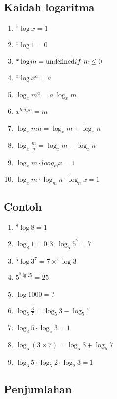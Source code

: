 \documentclass[
  letterpaper,
  DIV=11,
  numbers=noendperiod]{scrartcl}
\begin{document}
\subsection{Kaidah logaritma}\label{kaidah-logaritma}

\begin{enumerate}
\def\labelenumi{\arabic{enumi}.}
\item
  \(^x \log x = 1\)
\item
  \(^x \log 1 = 0\)
\item
  \(^x \log m = \text{undefined} \\ if\ m \le 0\)
\item
  \(^x \log x^a=a\)
\item
  \(\log_x m^a = a \ \log_x m\)
\item
  \(x^{log_x m}=m\)
\item
  \(\log_x mn = \log_x m + \log_x n\)
\item
  \(\log_x \frac{m}{n}=\log_x m-\log_x n\)
\item
  \(\log_x m \cdot loog_m x =1\)
\item
  \(\log_x m \cdot \log_m n \cdot \log_n x=1\)
\end{enumerate}

\subsection{Contoh}\label{contoh-2}

\begin{enumerate}
\def\labelenumi{\arabic{enumi}.}
\item
  \(^8\log 8=1\)
\item
  \(\log_8 1=0\) 3, \(\log_5 5^7=7\)
\item
  \(^5\log 3^7=7 \times ^5\log 3\)
\item
  \(5^{^5\lg 25}=25\)
\item
  \(\log 1000 = ?\)
\item
  \(\log_5 \frac{3}{7}=\log_5 3-\log_5 7\)
\item
  \(\log_3 5 \cdot \log_5 3 =1\)
\item
  \(\log_5 (3\times 7)=\log_5 3 + \log_5 7\)
\item
  \(\log_3 5 \cdot \log_5 2 \cdot \log_2 3=1\)
\end{enumerate}

\subsection{Penjumlahan}\label{penjumlahan}
\end{document}
